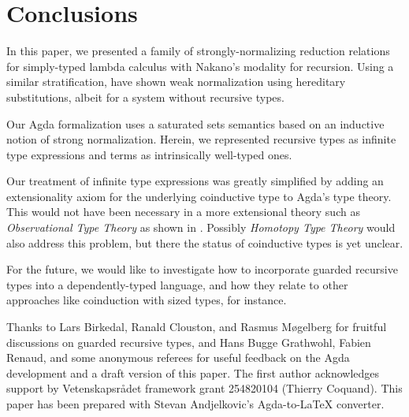 
\section{Conclusions}
\label{sec:concl}

In this paper, we presented a family of strongly-normalizing reduction
relations for simply-typed lambda calculus with Nakano's modality for
recursion. Using a similar stratification, \cite{krishnaswamiBenton:icfp11} have shown weak normalization
using hereditary substitutions, albeit
for a system without recursive types.

Our Agda formalization uses a saturated sets semantics based on an
inductive notion of strong normalization.  Herein, we represented
recursive types as infinite type expressions and terms as
intrinsically well-typed ones.

Our treatment of infinite type expressions was greatly simplified by
adding an extensionality axiom for the underlying coinductive type to
Agda's type theory.  This would not have been necessary in a more
extensional theory such as \emph{Observational Type Theory}
\citep{altenkirchMcBrideSwierstra:plpv07} as shown in \citep{mcBride:calco09}.  Possibly \emph{Homotopy Type
Theory} \citep{hott}
would also address this problem, but there the status of
coinductive types is yet unclear.

For the future, we would like to investigate how to incorporate
guarded recursive types into a dependently-typed language, and how
they relate to other approaches like coinduction with sized
types, for instance.

Thanks to Lars Birkedal, Ranald Clouston, and Rasmus M\o{}gelberg for
fruitful discussions on guarded recursive types, and Hans Bugge
Grathwohl, Fabien Renaud, and some anonymous referees for useful feedback on the Agda
development and a draft version of this paper.
The first author acknowledges support by Vetenskapsr\aa{}det framework
grant 254820104 (Thierry Coquand).  This paper has been prepared with
Stevan Andjelkovic's Agda-to-LaTeX converter.


